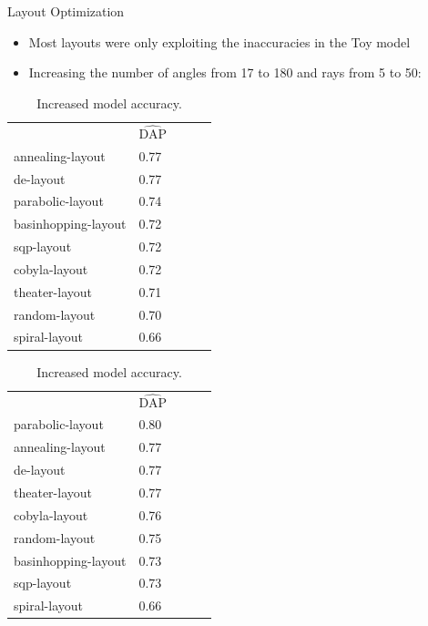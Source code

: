 \documentclass[10pt, xcolor={dvipsnames}]{beamer}
\begin{document}
\begin{frame}{Layout Optimization}
\begin{itemize}
\item Most layouts were only exploiting the inaccuracies in the Toy model
\item Increasing the number of angles from 17 to 180 and rays from 5 to 50:
\end{itemize}

\begin{table}
\parbox{.45\linewidth}{
\centering
\begin{tabular}{lllll}
              &  $\widehat{\text{DAP}}$    &  &  &  \\
annealing-layout    & 0.77 &  &  &  \\[.5em]
de-layout           & 0.77 &  &  &  \\[.5em]
parabolic-layout    & 0.74 &  &  &  \\[.5em]
basinhopping-layout & 0.72 &  &  &  \\[.5em]
sqp-layout          & 0.72 &  &  &  \\[.5em]
cobyla-layout       & 0.72 &  &  &  \\[.5em]
theater-layout      & 0.71 &  &  &  \\[.5em]
random-layout       & 0.70 &  &  &  \\[.5em]
spiral-layout       & 0.66 &  &  & 
\end{tabular}
\caption{Layout optimization accuracy.}
}
\hfill
\parbox{.45\linewidth}{
\centering
\begin{tabular}{lllll}
              &  $\widehat{\text{DAP}}$    &  &  &  \\
parabolic-layout    & 0.80 &  &  &  \\[.5em]
annealing-layout    & 0.77 &  &  &  \\[.5em]
de-layout           & 0.77 &  &  &  \\[.5em]
theater-layout      & 0.77 &  &  &  \\[.5em]
cobyla-layout       & 0.76 &  &  &  \\[.5em]
random-layout       & 0.75 &  &  &  \\[.5em]
basinhopping-layout & 0.73 &  &  &  \\[.5em]
sqp-layout          & 0.73 &  &  &  \\[.5em]
spiral-layout       & 0.66 &  &  &  
\end{tabular}
\caption{Increased model accuracy.}
}
\end{table}
\end{frame}
\end{document}
